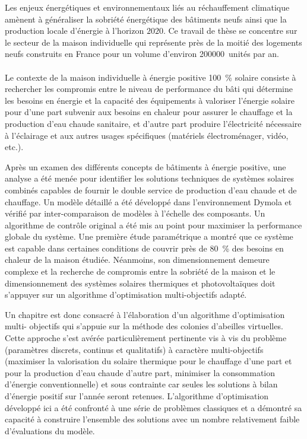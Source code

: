

Les enjeux énergétiques et environnementaux liés au réchauffement climatique amènent à
généraliser la sobriété énergétique des bâtiments neufs ainsi que la production locale
d’énergie à l’horizon $2020$. Ce travail de thèse se concentre sur le secteur de la maison
individuelle qui représente près de la moitié des logements neufs construits en France
pour un volume d’environ \SI{200000}{unités} par an.

\paragraph{} %
Le contexte de la maison individuelle à énergie positive \SI{100}{\percent} solaire consiste à
rechercher les compromis entre le niveau de performance du bâti qui détermine les besoins
en énergie et la capacité des équipements à valoriser l’énergie solaire pour d’une part
subvenir aux besoins en chaleur pour assurer le chauffage et la production d’eau chaude
sanitaire, et d’autre part produire l’électricité nécessaire à l’éclairage et aux autres
usages spécifiques (matériels électroménager, vidéo, etc.).

Après un examen des différents concepts de bâtiments à énergie positive, une analyse a été
menée pour identifier les solutions techniques de systèmes solaires combinés capables de
fournir le double service de production d’eau chaude et de chauffage. Un modèle détaillé a
été développé dans l’environnement Dymola et vérifié par inter-comparaison de modèles à
l’échelle des composants. Un algorithme de contrôle original a été mis au point pour
maximiser la performance globale du système. Une première étude paramétrique a montré que
ce système est capable dans certaines conditions de couvrir près de \SI{80}{\percent} des besoins en
chaleur de la maison étudiée. Néanmoins, son dimensionnement demeure complexe et la
recherche de compromis entre la sobriété de la maison et le dimensionnement des systèmes
solaires thermiques et photovoltaïques doit s’appuyer sur un algorithme d’optimisation
multi-objectifs adapté.

Un chapitre est donc consacré à l’élaboration d’un algorithme d’optimisation multi-
objectifs qui s’appuie sur la méthode des colonies d’abeilles virtuelles. Cette approche
s’est avérée particulièrement pertinente vis à vis du problème (paramètres discrets,
continus et qualitatifs) à caractère multi-objectifs (maximiser la valorisation du solaire
thermique pour le chauffage d’une part et pour la production d’eau chaude d’autre part,
minimiser la consommation d’énergie conventionnelle) et sous contrainte car seules les
solutions à bilan d’énergie positif sur l’année seront retenues. L’algorithme
d’optimisation développé ici a été confronté à une série de problèmes classiques et a
démontré sa capacité à construire l’ensemble des solutions avec un nombre relativement
faible d’évaluations du modèle.

